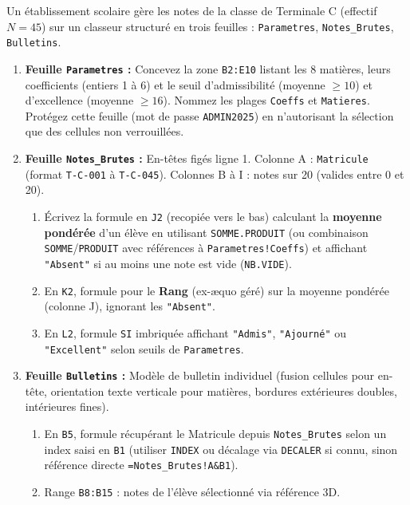 \documentclass[11pt]{article}
\begin{document}
\begin{exercice}
Un établissement scolaire gère les notes de la classe de Terminale C (effectif $N=45$) sur un classeur structuré en trois feuilles : \texttt{Parametres}, \texttt{Notes\_Brutes}, \texttt{Bulletins}.
\begin{enumerate}
    \item \textbf{Feuille \texttt{Parametres} :} Concevez la zone \texttt{B2:E10} listant les 8 matières, leurs coefficients (entiers 1 à 6) et le seuil d'admissibilité (moyenne $\ge 10$) et d'excellence (moyenne $\ge 16$). Nommez les plages \texttt{Coeffs} et \texttt{Matieres}. Protégez cette feuille (mot de passe \texttt{ADMIN2025}) en n'autorisant la sélection que des cellules non verrouillées.
    \item \textbf{Feuille \texttt{Notes\_Brutes} :} En-têtes figés ligne 1. Colonne A : \texttt{Matricule} (format \texttt{T-C-001} à \texttt{T-C-045}). Colonnes B à I : notes sur 20 (valides entre 0 et 20). 
    \begin{enumerate}
        \item Écrivez la formule en \texttt{J2} (recopiée vers le bas) calculant la \textbf{moyenne pondérée} d'un élève en utilisant \texttt{SOMME.PRODUIT} (ou combinaison \texttt{SOMME}/\texttt{PRODUIT} avec références à \texttt{Parametres!Coeffs}) et affichant \texttt{"Absent"} si au moins une note est vide (\texttt{NB.VIDE}).
        \item En \texttt{K2}, formule pour le \textbf{Rang} (ex-æquo géré) sur la moyenne pondérée (colonne J), ignorant les \texttt{"Absent"}.
        \item En \texttt{L2}, formule \texttt{SI} imbriquée affichant \texttt{"Admis"}, \texttt{"Ajourné"} ou \texttt{"Excellent"} selon seuils de \texttt{Parametres}.
    \end{enumerate}
    \item \textbf{Feuille \texttt{Bulletins} :} Modèle de bulletin individuel (fusion cellules pour en-tête, orientation texte verticale pour matières, bordures extérieures doubles, intérieures fines). 
    \begin{enumerate}
        \item En \texttt{B5}, formule récupérant le Matricule depuis \texttt{Notes\_Brutes} selon un index saisi en \texttt{B1} (utiliser \texttt{INDEX} ou décalage via \texttt{DECALER} si connu, sinon référence directe \texttt{=Notes\_Brutes!A\&B1}).
        \item Range \texttt{B8:B15} : notes de l'élève sélectionné via référence 3D.

\end{enumerate}
\end{enumerate}
\end{exercice}
\end{document}
